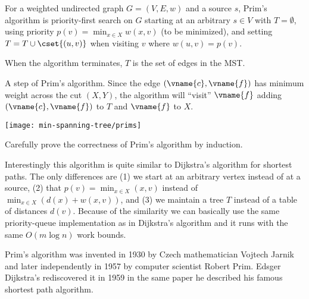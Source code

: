 \begin{algorithm}
For a weighted undirected graph $G=(V,E,w)$ and a source $s$, Prim's
algorithm is priority-first search on $G$ starting at an arbitrary $s
\in V$ with $T = \emptyset$, using priority $\displaystyle p(v) =
\min_{x \in X} w(x,v)$ (to be minimized), and setting $T = T \cup
\cset{(u,v)}$ when visiting $v$ where $w(u,v) = p(v)$.
\end{algorithm}

When the algorithm terminates, $T$ is the set of edges in the MST.

\begin{example}
A step of Prim's algorithm.  Since the edge $(\vname{c},\vname{f})$ has minimum weight
across the cut $(X,Y)$, the algorithm will ``visit'' $\vname{f}$ adding
$(\vname{c},\vname{f})$ to $T$ and $\vname{f}$ to $X$.
\begin{center}
\texttt{[image: min-spanning-tree/prims]}
\end{center}
\end{example}


\begin{exercise}
Carefully prove the correctness of Prim's algorithm by induction.
\end{exercise}

Interestingly this algorithm is quite similar to Dijkstra's algorithm
for shortest paths.  The only differences are (1) we start at an
arbitrary vertex instead of at a source, (2) that $p(v) = \min_{x \in
  X} (x,v)$ instead of $\min_{x \in X} (d(x) + w(x,v))$, and (3) we
maintain a tree $T$ instead of a table of distances $d(v)$.  Because
of the similarity we can basically use the same priority-queue
implementation as in Dijkstra's algorithm and it runs with the same
$O(m \log n)$ work bounds.


\begin{remark}
  Prim's algorithm was invented in 1930 by Czech mathematician Vojtech
  Jarnik and later independently in 1957 by computer scientist Robert
  Prim.  Edsger Dijkstra's rediscovered it in 1959 in the same paper
  he described his famous shortest path algorithm.
\end{remark}





